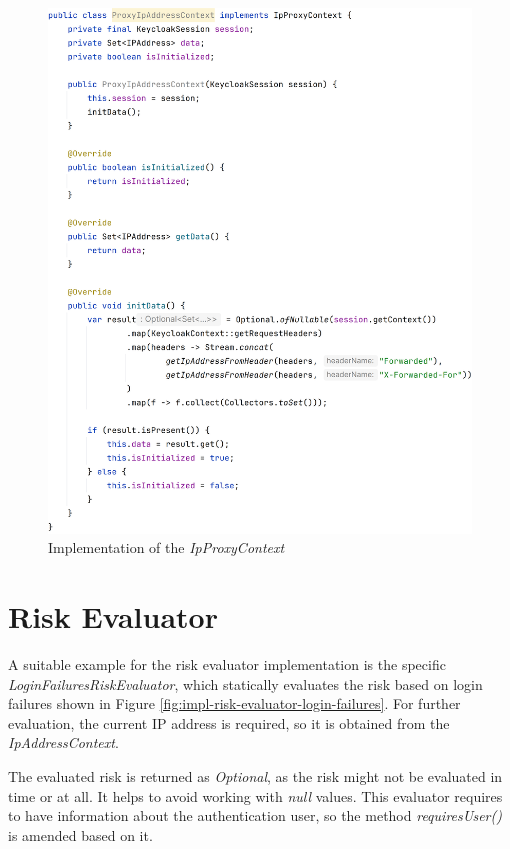 \begin{figure}[htbp]
  \centering
  \includegraphics[width=1\textwidth]{img/sections/6-implementation/proxyIpAddress-full.png}
  \caption{Implementation of the \textit{IpProxyContext}}
  \label{fig:impl-user-ctx-ip}
\end{figure}

\newpage
\section{Risk Evaluator}
A suitable example for the risk evaluator implementation is the specific \textit{LoginFailuresRiskEvaluator}, which statically evaluates the risk based on login failures shown in Figure \ref{fig:impl-risk-evaluator-login-failures}.
For further evaluation, the current IP address is required, so it is obtained from the \textit{IpAddressContext}.

The evaluated risk is returned as \textit{Optional}, as the risk might not be evaluated in time or at all. 
It helps to avoid working with \textit{null} values.
This evaluator requires to have information about the authentication user, so the method \textit{requiresUser()} is amended based on it.

